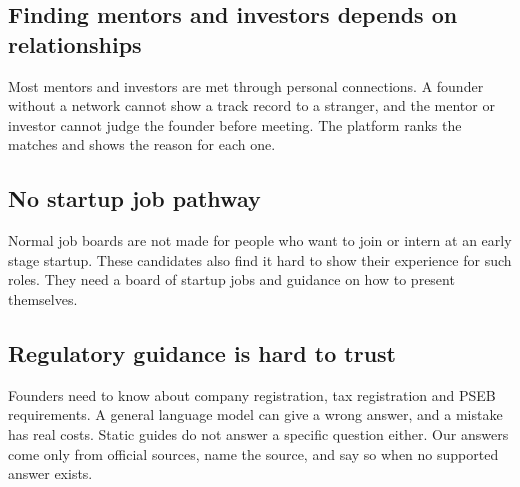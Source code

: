 \documentclass{FastFyp}
\begin{document}
\subsection{Finding mentors and investors depends on relationships}
Most mentors and investors are met through personal connections. A founder without a network cannot show a track record to a stranger, and the mentor or investor cannot judge the founder before meeting. The platform ranks the matches and shows the reason for each one.

\subsection{No startup job pathway}
Normal job boards are not made for people who want to join or intern at an early stage startup. These candidates also find it hard to show their experience for such roles. They need a board of startup jobs and guidance on how to present themselves.

\subsection{Regulatory guidance is hard to trust}
Founders need to know about company registration, tax registration and PSEB requirements. A general language model can give a wrong answer, and a mistake has real costs. Static guides do not answer a specific question either. Our answers come only from official sources, name the source, and say so when no supported answer exists.
\end{document}
